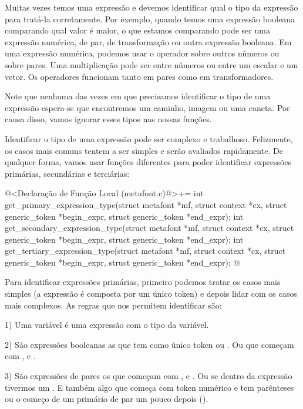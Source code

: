 {{{{{{

Muitas vezes temos uma expressão e devemos identificar qual o tipo da
expressão para tratá-la corretamente. Por exemplo, quando temos uma
expressão booleana comparando qual valor é maior, o que estamos
comparando pode ser uma expressão numérica, de par, de transformação
ou outra expressão booleana. Em uma expressão numérica, podemos usar o
operador  sobre outros números ou sobre pares. Uma
multiplicação pode ser entre números ou entre um escalar e um
vetor. Os operadores  funcionam tanto em pares como
em transformadores.

Note que nenhuma das vezes em que precisamos identificar o tipo de uma
expressão espera-se que encontremos um caminho, imagem ou uma caneta. Por
causa disso, vamos ignorar esses tipos nas nossas funções.

Identificar o tipo de uma expressão pode ser complexo e
trabalhoso. Felizmente, os casos mais comuns tentem a ser simples e
serão avaliados rapidamente. De qualquer forma, vamos usar funções
diferentes para poder identificar expressões primárias, secundárias e
terciárias:

\iniciocodigo
@<Declaração de Função Local (metafont.c)@>+=
int get_primary_expression_type(struct metafont *mf, struct context *cx,
                               struct generic_token *begin_expr,
                               struct generic_token *end_expr);
int get_secondary_expression_type(struct metafont *mf, struct context *cx,
                                 struct generic_token *begin_expr,
                                 struct generic_token *end_expr);
int get_tertiary_expression_type(struct metafont *mf, struct context *cx,
                                struct generic_token *begin_expr,
                                struct generic_token *end_expr);
@
\fimcodigo

Para identificar expressões primárias, primeiro podemos tratar os
casos mais simples (a expressão é composta por um único token) e
depois lidar com os casos mais complexos. As regras que nos permitem
identificar são:

1) Uma variável é uma expressão com o tipo da variável.

2) São expressões booleanas as que tem como único
token  ou . Ou que começam
com ,  e
.

3) São expressões de pares os que começam
com , 
e . Ou se dentro da expressão tivermos
um \monoespaco{[}. E também algo que começa com token numérico e tem
parênteses ou o começo de um primário de par um pouco depois
().

}}}}}}
